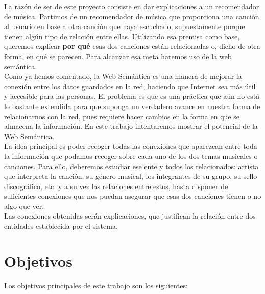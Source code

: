 La razón de ser de este proyecto consiste en dar explicaciones a un recomendador de música. Partimos de un recomendador de música que proporciona una canción al usuario en base a otra canción que haya escuchado, supuestamente porque tienen algún tipo de relación entre ellas. Utilizando esa premisa como base, queremos explicar \textbf{por qué} esas dos canciones están relacionadas o, dicho de otra forma, en qué se parecen. Para alcanzar esa meta haremos uso de la web semántica.\\

Como ya hemos comentado, la Web Semántica es una manera de mejorar la conexión entre los datos guardados en la red, haciendo que Internet sea más útil y accesible para las personas. El problema es que es una práctica que aún no está lo bastante extendida para que suponga un verdadero avance en nuestra forma de relacionarnos con la red, pues requiere hacer cambios en la forma en que se almacena la información. En este trabajo intentaremos mostrar el potencial de la Web Semántica.\\

La idea principal es poder recoger todas las conexiones que aparezcan entre toda la información que podamos recoger sobre cada uno de los dos temas musicales o canciones. Para ello, deberemos estudiar ese ente y todos los relacionados: artista que interpreta la canción, su género musical, los integrantes de su grupo, su sello discográfico, etc. y a su vez las relaciones entre estos, hasta disponer de suficientes conexiones que nos puedan asegurar que esas dos canciones tienen o no algo que ver.\\

Las conexiones obtenidas serán explicaciones, que justifican la relación entre dos entidades establecida por el sistema.\\

\section{Objetivos}

Los objetivos principales de este trabajo son los siguientes:\\

